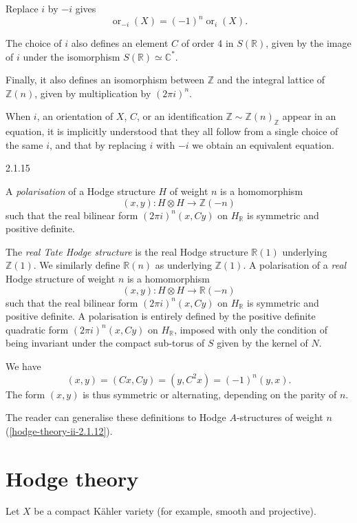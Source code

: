     Replace \(i\) by \(-i\) gives
    \[       \operatorname {or}_{-i}(X)       = (-1)^n\operatorname {or}_i(X).     \]\par{}The choice of \(i\) also defines an element \(C\) of order 4 in \(S(\mathbb {R})\), given by the image of \(i\) under the isomorphism \(S(\mathbb {R})\simeq \mathbb {C}^*\).\par{}Finally, it also defines an isomorphism between \(\mathbb {Z}\) and the integral lattice of \(\mathbb {Z}(n)\), given by multiplication by \((2\pi  i)^n\).\par{}When \(i\), an orientation of \(X\), \(C\), or an identification \(\mathbb {Z}\sim \mathbb {Z}(n)_\mathbb {Z}\) appear in an equation, it is implicitly understood that they all follow from a single choice of the same \(i\), and that by replacing \(i\) with \(-i\) we obtain an equivalent equation.\begin{definition}{2.1.15}\label{hodge-theory-ii-2.1.15}\skipsinglepar\par{}A \emph{polarisation} of a Hodge structure \(H\) of weight \(n\) is a homomorphism
    \[       (x,y)\colon  H\otimes  H \to  \mathbb {Z}(-n)     \]
    such that the real bilinear form \((2\pi  i)^n(x,Cy)\) on \(H_\mathbb {R}\) is symmetric and positive definite.\end{definition}\label{hodge-theory-ii-2.1.16}\par{}The \emph{real Tate Hodge structure} is the real Hodge structure \(\mathbb {R}(1)\) underlying \(\mathbb {Z}(1)\).
    We similarly define \(\mathbb {R}(n)\) as underlying \(\mathbb {Z}(1)\).
    A polarisation of a \emph{real} Hodge structure of weight \(n\) is a homomorphism
    \[       (x,y)\colon  H\otimes  H\to  \mathbb {R}(-n)     \]
    such that the real bilinear form \((2\pi  i)^n(x,Cy)\) on \(H_\mathbb {R}\) is symmetric and positive definite.
    A polarisation is entirely defined by the positive definite quadratic form \((2\pi  i)^n(x,Cy)\) on \(H_\mathbb {R}\), imposed with only the condition of being invariant under the compact sub-torus of \(S\) given by the kernel of \(N\).\par{}We have
    \[       (x,y)       = (Cx,Cy)       = (y,C^2x)       = (-1)^n(y,x).     \]
    The form \((x,y)\) is thus symmetric or alternating, depending on the parity of \(n\).\label{hodge-theory-ii-2.1.17}\par{}The reader can generalise these definitions to Hodge \(A\)-structures of weight \(n\) (\cref{hodge-theory-ii-2.1.12}).\section{Hodge theory}\label{hodge-theory-ii-2.2}\label{hodge-theory-ii-2.2.1}\par{}Let \(X\) be a compact Kähler variety (for example, smooth and projective).
